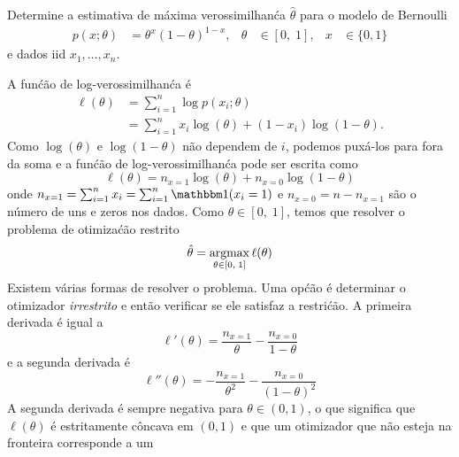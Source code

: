 \begin{exenumerate}
\begin{solution}
    \end{solution}
    
    \item \label{q:mle-bernoulli-alt} Determine a estimativa de m\'axima verossimilhan\'ca $\hat{\theta}$ para o
    modelo de Bernoulli
    \begin{align}
        p(x; \theta) &= \theta^{x} (1-\theta)^{1-x},& \theta &\in [0,\;1],&  x &\in\{0,1\} 
    \end{align}
    e dados iid $x_1, \ldots, x_n$.
    \begin{solution}
        A fun\'c\~ao de log-verossimilhan\'ca \'e
        \begin{align}      
            \ell(\theta) & = \sum_{i=1}^n \log p(x_i; \theta) \\
            & = \sum_{i=1}^n x_i \log(\theta) + (1-x_i) \log(1-\theta).
        \end{align}
        Como $\log(\theta)$ e $\log(1-\theta)$ n\~ao dependem de $i$, podemos pux\'a-los para fora da soma e a fun\'c\~ao de log-verossimilhan\'ca pode ser escrita como
        \begin{equation}
            \ell(\theta) = n_{x=1} \log (\theta) + n_{x=0} \log(1-\theta)
        \end{equation}
        onde $n_{x=1} = \sum_{i=1}^n x_i = \sum_{i=1}^n \ind(x_i=1)$ e
        $n_{x=0} = n-n_{x=1}$ s\~ao o n\'umero de uns e zeros nos
        dados. Como $\theta \in [0,\;1]$, temos que resolver o problema de
        otimiza\'c\~ao restrito
        \begin{equation}
            \hat{\theta} = \operatorname*{\mathrm{argmax}}_{\theta \in [0,\;1]}   \ell(\theta)
        \end{equation}
        Existem v\'arias formas de resolver o problema. Uma op\'c\~ao \'e
        determinar o otimizador \emph{irrestrito} e ent\~ao verificar se ele
        satisfaz a restri\'c\~ao. A primeira derivada \'e igual a
        \begin{equation}
            \ell'(\theta) = \frac{n_{x=1}}{\theta} - \frac{n_{x=0}}{1-\theta}
        \end{equation}
        e a segunda derivada \'e
        \begin{equation}
            \ell''(\theta) = -\frac{n_{x=1}}{\theta^2} - \frac{n_{x=0}}{(1-\theta)^2}
        \end{equation}
        A segunda derivada \'e sempre negativa para $\theta \in (0,1)$,
        o que significa que $\ell(\theta)$ \'e estritamente c\^oncava em $(0,1)$
        e que um otimizador que n\~ao esteja na fronteira corresponde a um

\end{solution}
\end{exenumerate}
